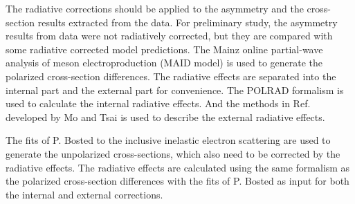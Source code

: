 The radiative corrections should be applied to the asymmetry and the cross-section results extracted from the data. For preliminary study, the asymmetry results from data were not radiatively corrected, but they are compared with some radiative corrected model predictions. The Mainz online partial-wave analysis of meson electroproduction (MAID model) \cite{Drechsel2007} is used to generate the polarized cross-section differences. The radiative effects are separated into the internal part and the external part for convenience. The POLRAD formalism \cite{Akushevich1997} is used to calculate the internal radiative effects. And the methods in Ref. \cite{Mo1969} developed by Mo and Tsai is used to describe the external radiative effects.

The fits of P. Bosted to the inclusive inelastic electron scattering \cite{Bosted2008} are used to generate the unpolarized cross-sections, which also need to be corrected by the radiative effects. The radiative effects are calculated using the same formalism as the polarized cross-section differences with the fits of P. Bosted as input for both the internal and external corrections.

